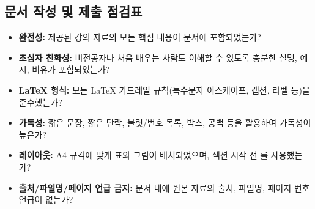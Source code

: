 \documentclass[11pt,a4paper]{article}
\theoremstyle{definition}
\begin{document}
\subsection{문서 작성 및 제출 점검표}
\begin{itemize}
    \item \textbf{완전성:} 제공된 강의 자료의 모든 핵심 내용이 문서에 포함되었는가?
    \item \textbf{초심자 친화성:} 비전공자나 처음 배우는 사람도 이해할 수 있도록 충분한 설명, 예시, 비유가 포함되었는가?
    \item \textbf{LaTeX 형식:} 모든 LaTeX 가드레일 규칙(특수문자 이스케이프, 캡션, 라벨 등)을 준수했는가?
    \item \textbf{가독성:} 짧은 문장, 짧은 단락, 불릿/번호 목록, 박스, 공백 등을 활용하여 가독성이 높은가?
    \item \textbf{레이아웃:} A4 규격에 맞게 표와 그림이 배치되었으며, 섹션 시작 전 \texttt{\newpage}를 사용했는가?
    \item \textbf{출처/파일명/페이지 언급 금지:} 문서 내에 원본 자료의 출처, 파일명, 페이지 번호 언급이 없는가?
\end{itemize}
\end{document}
